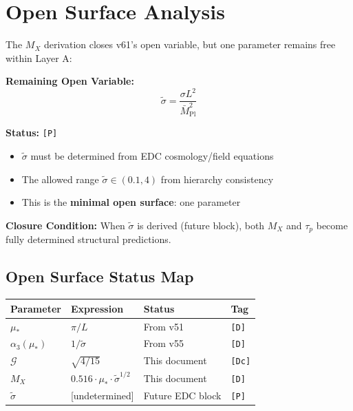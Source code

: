 \documentclass[11pt,a4paper]{article}
\newcommand{\tagD}{\textcolor{green!50!black}{\texttt{[D]}}}
\newcommand{\tagDc}{\textcolor{blue!70!black}{\texttt{[Dc]}}}
\newcommand{\tagP}{\textcolor{orange!80!black}{\texttt{[P]}}}
\theoremstyle{definition}
\begin{document}
\section{Open Surface Analysis}
\label{sec:open-surface}

\begin{opensurfacebox}
The $M_X$ derivation closes v61's open variable, but one parameter remains
free within Layer A:

\textbf{Remaining Open Variable:}
\begin{equation}
\label{eq:open-variable}
\boxed{\tilde{\sigma} = \frac{\sigma L^2}{\bar{M}_{\text{Pl}}^2}}
\end{equation}

\textbf{Status:} \tagP{}
\begin{itemize}
  \item $\tilde{\sigma}$ must be determined from EDC cosmology/field equations
  \item The allowed range $\tilde{\sigma} \in (0.1, 4)$ from hierarchy consistency
  \item This is the \textbf{minimal open surface}: one parameter
\end{itemize}

\textbf{Closure Condition:}
When $\tilde{\sigma}$ is derived (future block), both $M_X$ and $\tau_p$ become
fully determined structural predictions.
\end{opensurfacebox}

\subsection{Open Surface Status Map}
\label{subsec:status-map}

\begin{center}
\begin{tabular}{llll}
\toprule
Parameter & Expression & Status & Tag \\
\midrule
$\mu_*$ & $\pi/L$ & From v51 & \tagD{} \\
$\alpha_3(\mu_*)$ & $1/\tilde{\sigma}$ & From v55 & \tagD{} \\
$\mathcal{G}$ & $\sqrt{4/15}$ & This document & \tagDc{} \\
$M_X$ & $0.516 \cdot \mu_* \cdot \tilde{\sigma}^{1/2}$ & This document & \tagD{} \\
$\tilde{\sigma}$ & [undetermined] & Future EDC block & \tagP{} \\
\bottomrule
\end{tabular}
\end{center}
\end{document}

